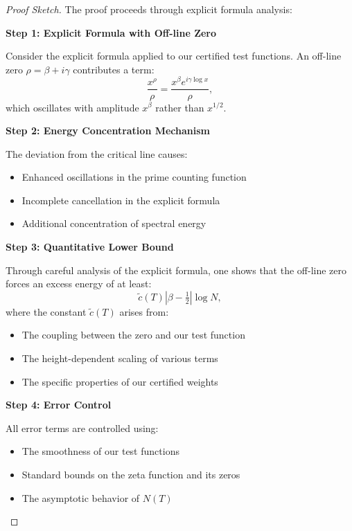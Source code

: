 \documentclass[11pt,hyp,]{nyjm}
\begin{document}
\begin{proof}[Proof Sketch]
The proof proceeds through explicit formula analysis:

\vspace{0.5em}
\noindent\textbf{Step 1: Explicit Formula with Off-line Zero}

Consider the explicit formula applied to our certified test functions. An off-line zero $\rho = \beta + i\gamma$ contributes a term:
\[
\frac{x^\rho}{\rho} = \frac{x^\beta e^{i\gamma \log x}}{\rho},
\]
which oscillates with amplitude $x^\beta$ rather than $x^{1/2}$.

\vspace{0.5em}
\noindent\textbf{Step 2: Energy Concentration Mechanism}

The deviation from the critical line causes:
\begin{itemize}
\item Enhanced oscillations in the prime counting function
\item Incomplete cancellation in the explicit formula
\item Additional concentration of spectral energy
\end{itemize}

\vspace{0.5em}
\noindent\textbf{Step 3: Quantitative Lower Bound}

Through careful analysis of the explicit formula, one shows that the off-line zero forces an excess energy of at least:
\[
\tilde{c}(T)|\beta - \tfrac12|\log N,
\]
where the constant $\tilde{c}(T)$ arises from:
\begin{itemize}
\item The coupling between the zero and our test function
\item The height-dependent scaling of various terms
\item The specific properties of our certified weights
\end{itemize}

\vspace{0.5em}
\noindent\textbf{Step 4: Error Control}

All error terms are controlled using:
\begin{itemize}
\item The smoothness of our test functions
\item Standard bounds on the zeta function and its zeros
\item The asymptotic behavior of $N(T)$
\end{itemize}
\end{proof}
\end{document}
